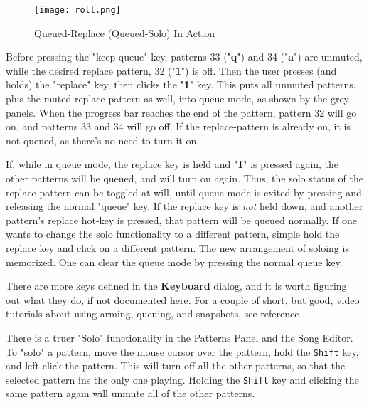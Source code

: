 \begin{figure}[H]
   \centering 
   \texttt{[image: roll.png]}
   \caption{Queued-Replace (Queued-Solo) In Action}
   \label{fig:queued_replace}
\end{figure}

   Before pressing the "keep queue" key, patterns 33 ("\textbf{q}")
   and 34 ("\textbf{a}") are
   unmuted, while the desired replace pattern, 32 ("\textbf{1}") is off.
   Then the user presses (and holds) the "replace" key, then clicks the
   "\textbf{1}" key.
   This puts all unmuted patterns, plus the muted
   replace pattern as well, into queue mode, as shown by the grey panels.
   When the progress bar reaches the end of the pattern, pattern 32 will go on,
   and patterns 33 and 34 will go off.
   If the replace-pattern is already on, it is not queued, as
   there's no need to turn it on.

   If, while in queue mode, the replace key is held and
   "\textbf{1}" is pressed again,
   the other patterns will be queued, and will turn on again.  Thus, the
   solo status of the replace pattern can be toggled at will, until queue mode
   is exited by pressing and releasing the normal "queue" key.
   If the replace key is \textsl{not} held down, and another pattern's replace
   hot-key is pressed, that pattern will be queued normally.
   If one wants to change the solo functionality to a different pattern,
   simple hold the replace key and click on a different pattern.  The new
   arrangement of soloing is memorized.
   One can clear the queue mode by pressing the normal queue key.

   There are more keys defined in the \textbf{Keyboard} dialog, and it is
   worth figuring out what they do, if not documented here.
   For a couple of short, but good, video tutorials about using arming,
   queuing, and snapshots, see reference \cite{wootangent1}.

   There is a truer "Solo" functionality in the Patterns
   Panel and the Song Editor.  To "solo" a pattern, move the mouse cursor
   over the pattern, hold the \texttt{Shift} key, and left-click the pattern.
   This will turn off all the other patterns, so that the selected pattern ins
   the only one playing.  Holding the \texttt{Shift} key and clicking the same
   pattern again will unmute all of the other patterns.

